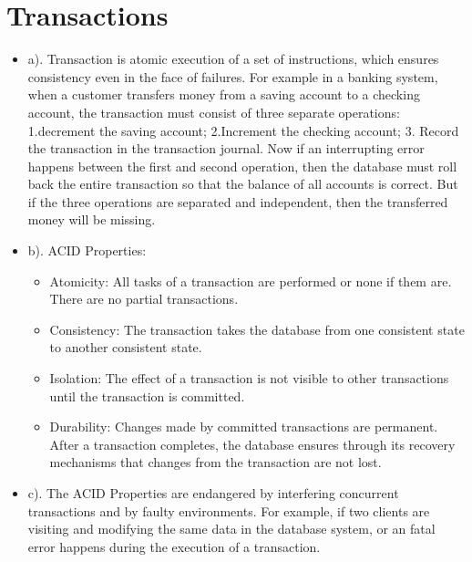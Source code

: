 \documentclass[a4paper, 14pt]{article}
\begin{document}
\section{Transactions}
\begin{itemize}
\item a). Transaction is atomic execution of a set of instructions, which ensures consistency even in the face of failures. For example in a banking system, when a customer transfers money from a saving account to a checking account, the transaction must consist of three separate operations: 1.decrement the saving account; 2.Increment the checking account; 3. Record the transaction in the transaction journal. Now if an interrupting error happens between the first and second operation, then the database must roll back the entire transaction so that the balance of all accounts is correct. But if the three operations are separated and independent, then the transferred money will be missing.
\item b). ACID Properties: \\
    \begin{itemize}
    \item Atomicity: All tasks of a transaction are performed or none if them are. There are no partial transactions.
    \item Consistency: The transaction takes the database from one consistent state to another consistent state.
    \item Isolation: The effect of a transaction is not visible to other transactions until the transaction is committed.
    \item Durability: Changes made by committed transactions are permanent. After a transaction completes, the database ensures through its recovery mechanisms that changes from the transaction are not lost.
    \end {itemize}
\item c). The ACID Properties are endangered by interfering concurrent transactions and by faulty environments. For example, if two clients are visiting and modifying the same data in the database system, or an fatal error happens during the execution of a transaction. 

\end{itemize}
\end{document}
